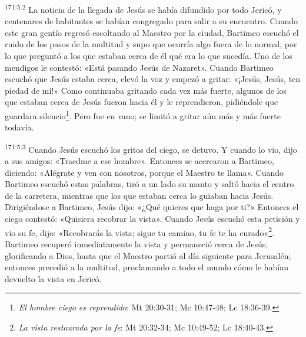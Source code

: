 \par
\textsuperscript{171:5.2} La noticia de la llegada de Jesús se había difundido por todo Jericó, y centenares de habitantes se habían congregado para salir a su encuentro. Cuando este gran gentío regresó escoltando al Maestro por la ciudad, Bartimeo escuchó el ruido de los pasos de la multitud y supo que ocurría algo fuera de lo normal, por lo que preguntó a los que estaban cerca de él qué era lo que sucedía. Uno de los mendigos le contestó: «Está pasando Jesús de Nazaret». Cuando Bartimeo escuchó que Jesús estaba cerca, elevó la voz y empezó a gritar: «¡Jesús, Jesús, ten piedad de mí!» Como continuaba gritando cada vez más fuerte, algunos de los que estaban cerca de Jesús fueron hacia él y le reprendieron, pidiéndole que guardara silencio\footnote{\textit{El hombre ciego es reprendido}: Mt 20:30-31; Mc 10:47-48; Lc 18:36-39.}. Pero fue en vano; se limitó a gritar aún más y más fuerte todavía.

\par
\textsuperscript{171:5.3} Cuando Jesús escuchó los gritos del ciego, se detuvo. Y cuando lo vio, dijo a sus amigos: «Traedme a ese hombre». Entonces se acercaron a Bartimeo, diciendo: «Alégrate y ven con nosotros, porque el Maestro te llama». Cuando Bartimeo escuchó estas palabras, tiró a un lado su manto y saltó hacia el centro de la carretera, mientras que los que estaban cerca lo guiaban hacia Jesús. Dirigiéndose a Bartimeo, Jesús dijo: «¿Qué quieres que haga por ti?» Entonces el ciego contestó: «Quisiera recobrar la vista». Cuando Jesús escuchó esta petición y vio su fe, dijo: «Recobrarás la vista; sigue tu camino, tu fe te ha curado»\footnote{\textit{La vista restaurada por la fe}: Mt 20:32-34; Mc 10:49-52; Lc 18:40-43.}. Bartimeo recuperó inmediatamente la vista y permaneció cerca de Jesús, glorificando a Dios, hasta que el Maestro partió al día siguiente para Jerusalén; entonces precedió a la multitud, proclamando a todo el mundo cómo le habían devuelto la vista en Jericó.

